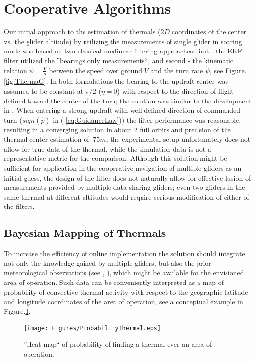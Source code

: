 \documentclass{ifacconf}
\begin{document}
\section{Cooperative Algorithms}
\label{sec:CoopAlgs}
Our initial approach to the estimation of thermals ($2D$ coordinates of the center vs. the glider altitude) by utilizing the measurements of single glider in soaring mode was based on two classical nonlinear filtering approaches: first - the EKF  filter utilized the ''bearings only measurements``, and second - the kinematic relation $\dot{\psi}=\frac{V}{\rho}$ between the speed over ground $V$ and the turn rate $\dot{\psi}$, see Figure.\ref{fig:ThermaG}. In both formulations the bearing to the updraft center was assumed to be constant at $\pi/2$ ($\eta=0$)  with respect to the direction of flight defined toward the center of the turn; the solution was similar to the development in \cite{Dobrokhodov:2008}. When entering a strong updraft with well-defined direction of commanded turn ($sign(\hat{p})$ in ( \ref{eq:GuidanceLaw})) the filter performance was reasonable, resulting in a converging solution in about 2 full orbits and precision of the thermal center estimation of $~75m$; the experimental setup unfortunately does not allow for true data of the thermal, while the simulation data is not a representative metric for the comparison. Although this solution might be sufficient for application in the cooperative navigation of multiple gliders as an initial guess, the design of the filter does not naturally allow for effective fusion of measurements provided by multiple data-sharing gliders; even two gliders in the same thermal at different altitudes would require serious modification of either of the filters.

\subsection{Bayesian Mapping of Thermals}
\label{subsec:BayesianMapping}
To increase the efficiency of online implementation the solution should integrate not only the
knowledge gained by multiple gliders, but also the prior meteorological observations
(see \cite{Pennycuick:1998}, \cite{Hindman:2007}), which might be available for the
envisioned area of operation. Such data can be conveniently interpreted as a map of probability
of convective thermal activity with respect to the geographic latitude and longitude coordinates
of the area of operation, see a conceptual example in Figure.\ref{fig:HeatMap}.
\begin{figure}[thpb]
  \centering
  \texttt{[image: Figures/ProbabilityThermal.eps]}
  \caption{''Heat map`` of probability of finding a thermal over an area of operation.}
  \label{fig:HeatMap}
\end{figure}
\end{document}
